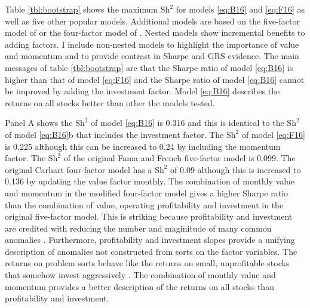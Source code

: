 

Table \ref{tbl:bootstrap} shows the maximum $\text{Sh}^2$ for models
\ref{eq:B16} and \ref{eq:F16} as well as five other popular models.
Additional models are based on the five-factor model of \textcite{fama2015five}
or the four-factor model of \textcite{carhart1997persistence}.
Nested models show incremental benefits to adding factors.
I include non-nested models to highlight the importance of value and momentum
and to provide contrast in Sharpe and GRS evidence.
The main messages of table \ref{tbl:bootstrap} are that the Sharpe ratio of
model \ref{eq:B16} is higher than that of model \ref{eq:F16} and the Sharpe
ratio of model \ref{eq:B16} cannot be improved by adding the investment factor.
Model \ref{eq:B16} describes the returns on all stocks better than other the
models tested.

Panel A shows the $\text{Sh}^2$ of model \ref{eq:B16} is 0.316 and this
is identical to the $\text{Sh}^2$ of model \ref{eq:B16}b that includes
the investment factor.
The $\text{Sh}^2$ of model \ref{eq:F16} is 0.225 although this can be
increased to 0.24 by including the momentum factor.
The $\text{Sh}^2$ of the original Fama and French five-factor model is 0.099.
The original Carhart four-factor model has a $\text{Sh}^2$ of 0.09 although
this is increased to 0.136 by updating the value factor monthly.
The combination of monthly value and momentum in the modified four-factor
model gives a higher Sharpe ratio than the combination of value, operating
profitability and investment in the original five-factor model.
This is striking because profitability and investment are credited with
reducing the number and maginitude of many common anomalies
\parencite{fama2015five}.
Furthermore, profitability and investment slopes provide a unifying description
of anomalies not constructed from sorts on the factor variables.
The returns on problem sorts behave like the returns on small,
unprofitable stocks that somehow invest aggressively
\parencite{fama2016dissecting}.
The combination of monthly value and momentum provides a better description of
the returns on all stocks than profitability and investment.

